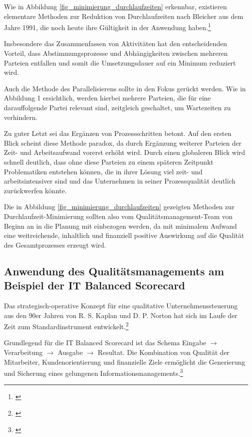 Wie in Abbildung \ref{fig_minimierung_durchlaufzeiten} erkennbar, existieren elementare Methoden zur Reduktion von Durchlaufzeiten nach Bleicher aus dem Jahre 1991, die noch heute ihre Gültigkeit in der Anwendung haben.\footnote{\cite{bleicher_organisation_1991}}

Insbesondere das Zusammenfassen von Aktivitäten hat den entscheidenden Vorteil, dass Abstimmungsprozesse und Abhängigkeiten zwischen mehreren Parteien entfallen und somit die Umsetzungsdauer auf ein Minimum reduziert wird. 

Auch die Methode des Parallelisierens sollte in den Fokus gerückt werden. Wie in Abbildung 1 ersichtlich, werden hierbei mehrere Parteien, die für eine darauffolgende Partei relevant sind, zeitgleich geschaltet, um Wartezeiten zu verhindern. 

Zu guter Letzt sei das Ergänzen von Prozessschritten betont. Auf den ersten Blick scheint diese Methode paradox, da durch Ergänzung weiterer Parteien der Zeit- und Arbeitsaufwand vorerst erhöht wird. Durch einen globaleren Blick wird schnell deutlich, dass ohne diese Parteien zu einem späteren Zeitpunkt Problematiken entstehen können, die in ihrer Lösung viel zeit- und arbeitsintensiver sind und das Unternehmen in seiner Prozessqualität deutlich zurückwerfen könnte.

Die in Abbildung \ref{fig_minimierung_durchlaufzeiten} gezeigten Methoden zur Durchlaufzeit-Minimierung sollten also vom Qualitätsmanagement-Team von Beginn an in die Planung mit einbezogen werden, da mit minimalem Aufwand eine weitreichende, inhaltlich und finanziell positive Auswirkung auf die Qualität des Gesamtprozesses erzeugt wird. 

\subsection{Anwendung des Qualitätsmanagements am Beispiel der IT Balanced Scorecard}
Das strategisch-operative Konzept für eine qualitative Unternehmenssteuerung aus den 90er Jahren von R. S. Kaplan und D. P. Norton hat sich im Laufe der Zeit zum Standardinstrument entwickelt.\footnote{\cite{friedag_scorecard_2004}}

Grundlegend für die IT Balanced Scorecard ist das Schema Eingabe $\to$ Verarbeitung $\to$ Ausgabe $\to$ Resultat. Die Kombination von Qualität der Mitarbeiter, Kundenorientierung und finanzielle Ziele ermöglicht die Generierung und Sicherung eines gelungenen Informationsmanagements.\footnote{\cite{gabriel_inm_2003}}

